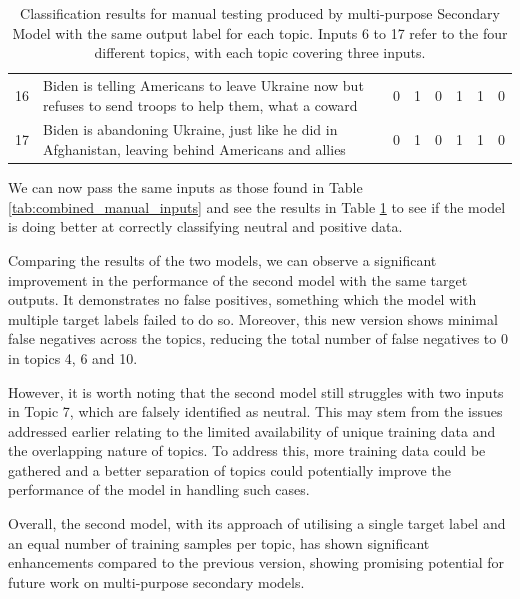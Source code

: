 \begin{table}[ht]
{\begin{tabular}{lp{10cm}cccccc}
            16                                 & Biden is telling Americans to leave Ukraine now but refuses to send troops to help them, what a coward                     & 0                                & 1               & 0       & 1      & 1      & 0               \\
            17                                 & Biden is abandoning Ukraine, just like he did in Afghanistan, leaving behind Americans and allies                          & 0                                & 1               & 0       & 1      & 1      & 0               \\
            \bottomrule
        \end{tabular}%
    }
    \vspace{5pt}
    \caption{Classification results for manual testing produced by multi-purpose Secondary Model with the same output label for each topic. Inputs 6 to 17 refer to the four different topics, with each topic covering three inputs.}
    \label{tab:combined_sl_manual_inputs}
\end{table}

We can now pass the same inputs as those found in Table \ref{tab:combined_manual_inputs} and see the results in Table \ref{tab:combined_sl_manual_inputs} to see if the model is doing better at correctly classifying neutral and positive data.

Comparing the results of the two models, we can observe a significant improvement in the performance of the second model with the same target outputs. It demonstrates no false positives, something which the model with multiple target labels failed to do so. Moreover, this new version shows minimal false negatives across the topics, reducing the total number of false negatives to 0 in topics 4, 6 and 10.

However, it is worth noting that the second model still struggles with two inputs in Topic 7, which are falsely identified as neutral. This may stem from the issues addressed earlier relating to the limited availability of unique training data and the overlapping nature of topics. To address this, more training data could be gathered and a better separation of topics could potentially improve the performance of the model in handling such cases.

Overall, the second model, with its approach of utilising a single target label and an equal number of training samples per topic, has shown significant enhancements compared to the previous version, showing promising potential for future work on multi-purpose secondary models.

